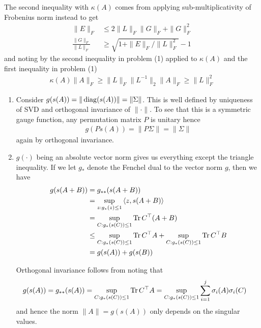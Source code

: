 \documentclass[12pt,letterpaper,boxed]{hmcpset}
\begin{document}
\begin{solution}
\begin{enumerate}
      The second inequality with $\kappa(A)$ comes from applying
      sub-multiplicativity of Frobenius norm instead to get
      \begin{align}
	\|E\|_F &\leq 2 \|L\|_F \|G\|_F + \|G\|_F^2 \\
	\frac{\|G\|_F}{\|L\|_F} &\geq \sqrt{1 + \|E\|_F / \|L\|_F^2}  - 1
      \end{align}
      and noting by the second inequality in problem (1) applied to $\kappa(A)$
      and the first inequality in problem (1)
      \begin{align}
	\kappa(A) \|A\|_F
	\geq \|L\|_F \|L^{-1}\|_2 \|A\|_F
	\geq \|L\|_F^2
      \end{align}
  \end{enumerate}
\end{solution}

\begin{problem}
\end{problem}

\begin{solution}
  \begin{enumerate}
    \item
      Consider $g(s(A)) = \|\operatorname{diag}(s(A))\| = \|\Sigma\|$.  This is well defined by
      uniqueness of SVD and orthogonal invariance of $\|\cdot\|$.
      To see that this is a symmetric gauge function, any permutation
      matrix $P$ is unitary hence
      \begin{align}
	g(P s(A)) = \|P \Sigma \| = \| \Sigma \|
      \end{align}
      again by orthogonal invariance.
    \item
      $g(\cdot)$ being an absolute vector norm gives us everything except the
      triangle inequality. If we let $g_*$ denote the Fenchel dual to
      the vector norm $g$, then we have
      \begin{align}
	g(s(A+B))
	&= g_{**}(s(A+B)) \\
	&= \sup_{z : g_*(z) \leq 1} \braket{z,s(A+B)}  \\
	&= \sup_{C : g_*(s(C)) \leq 1} \operatorname{Tr} C^\top (A+B) \\
	&\leq \sup_{C : g_*(s(C)) \leq 1} \operatorname{Tr} C^\top A
	+ \sup_{C : g_*(s(C)) \leq 1} \operatorname{Tr} C^\top B \\
	&= g(s(A)) + g(s(B))
      \end{align}

      Orthogonal invariance follows from noting that
      \begin{align}
	g(s(A))
	&= g_{**}(s(A))
	= \sup_{C : g_*(s(C)) \leq 1} \operatorname{Tr} C^\top A
	= \sup_{C : g_*(s(C)) \leq 1} \sum_{i=1}^j \sigma_i(A) \sigma_i(C)
      \end{align}
      and hence the norm $\|A\| = g(s(A))$ only depends on the singular values.
  \end{enumerate}
\end{solution}
\end{document}

